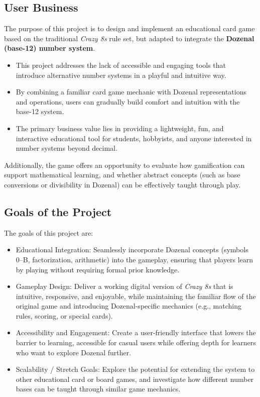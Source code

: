 \documentclass[12pt]{article}
\begin{document}
\subsection{User Business}
The purpose of this project is to design and implement an educational card game based on the traditional \textit{Crazy 8s} rule set, but adapted to integrate the \textbf{Dozenal (base-12) number system}.
\begin{itemize}
    \item This project addresses the lack of accessible and engaging tools that introduce alternative number systems in a playful and intuitive way.
    \item By combining a familiar card game mechanic with Dozenal representations and operations, users can gradually build comfort and intuition with the base-12 system.
    \item The primary business value lies in providing a lightweight, fun, and interactive educational tool for students, hobbyists, and anyone interested in number systems beyond decimal.
\end{itemize}
Additionally, the game offers an opportunity to evaluate how gamification can support mathematical learning, and whether abstract concepts (such as base conversions or divisibility in Dozenal) can be effectively taught through play.

\subsection{Goals of the Project}
The goals of this project are:
\begin{itemize}
    \item Educational Integration: Seamlessly incorporate Dozenal concepts (symbols 0--B, factorization, arithmetic) into the gameplay, ensuring that players learn by playing without requiring formal prior knowledge.
    \item Gameplay Design: Deliver a working digital version of \textit{Crazy 8s} that is intuitive, responsive, and enjoyable, while maintaining the familiar flow of the original game and introducing Dozenal-specific mechanics (e.g., matching rules, scoring, or special cards).
    \item Accessibility and Engagement: Create a user-friendly interface that lowers the barrier to learning, accessible for casual users while offering depth for learners who want to explore Dozenal further.
    \item Scalability / Stretch Goals: Explore the potential for extending the system to other educational card or board games, and investigate how different number bases can be taught through similar game mechanics.
\end{itemize}
\end{document}
